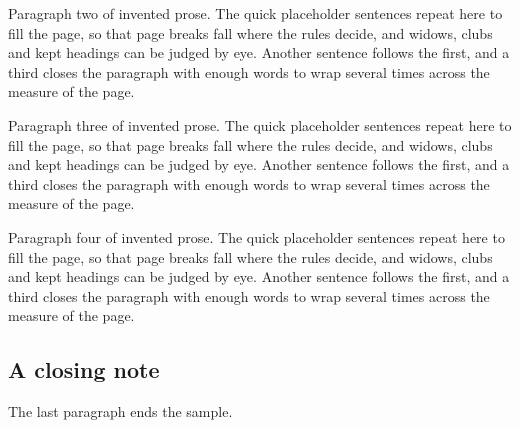 \documentclass{ltflow}
\begin{document}
Paragraph two of invented prose. The quick placeholder sentences repeat here to fill the page,
so that page breaks fall where the rules decide, and widows, clubs and kept headings can be
judged by eye. Another sentence follows the first, and a third closes the paragraph with enough
words to wrap several times across the measure of the page.

Paragraph three of invented prose. The quick placeholder sentences repeat here to fill the
page, so that page breaks fall where the rules decide, and widows, clubs and kept headings can
be judged by eye. Another sentence follows the first, and a third closes the paragraph with
enough words to wrap several times across the measure of the page.

Paragraph four of invented prose. The quick placeholder sentences repeat here to fill the page,
so that page breaks fall where the rules decide, and widows, clubs and kept headings can be
judged by eye. Another sentence follows the first, and a third closes the paragraph with enough
words to wrap several times across the measure of the page.
\subsection{A closing note}
The last paragraph ends the sample.
\end{document}
